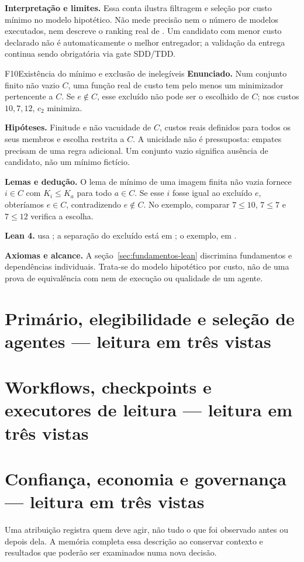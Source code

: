 \begin{descricao}
\textbf{Interpretação e limites.} Essa conta ilustra filtragem e seleção por
custo mínimo no modelo hipotético. Não mede precisão nem o número de modelos
executados, nem descreve o ranking real de . Um candidato com
menor custo declarado não é automaticamente o melhor entregador; a validação
da entrega continua sendo obrigatória via gate SDD/TDD.
\end{descricao}

\begin{formalizacao}{F10}{Existência do mínimo e exclusão de inelegíveis}
\textbf{Enunciado.} Num conjunto finito não vazio $C$, uma função real de
custo tem pelo menos um minimizador pertencente a $C$. Se $e\notin C$, esse
excluído não pode ser o escolhido de $C$; nos custos $10,7,12$, $c_2$ minimiza.

\textbf{Hipóteses.} Finitude e não vacuidade de $C$, custos reais definidos
para todos os seus membros e escolha restrita a $C$. A unicidade não é
pressuposta: empates precisam de uma regra adicional. Um conjunto vazio
significa ausência de candidato, não um mínimo fictício.

\textbf{Lemas e dedução.} O lema de mínimo de uma imagem finita não vazia
fornece $i\in C$ com $K_i\leq K_a$ para todo $a\in C$. Se esse $i$ fosse
igual ao excluído $e$, obteríamos $e\in C$, contradizendo $e\notin C$.
No exemplo, comparar $7\leq10$, $7\leq7$ e $7\leq12$ verifica a escolha.

\textbf{Lean 4.}  usa
; a separação do excluído está em
; o exemplo, em
.

\textbf{Axiomas e alcance.} A seção~\ref{sec:fundamentos-lean} discrimina
fundamentos e dependências individuais. Trata-se do modelo hipotético por
custo, não de uma prova de equivalência com  nem de execução
ou qualidade de um agente.
\end{formalizacao}


\clearpage\section{Primário, elegibilidade e seleção de agentes — leitura em três vistas}\label{arch:AR02}



\clearpage\section{Workflows, checkpoints e executores de leitura — leitura em três vistas}\label{arch:AR04}



\clearpage\section{Confiança, economia e governança — leitura em três vistas}\label{arch:AR09}





Uma atribuição registra quem deve agir, não tudo o que foi observado antes ou depois dela. A memória completa essa descrição ao conservar contexto e resultados que poderão ser examinados numa nova decisão.
